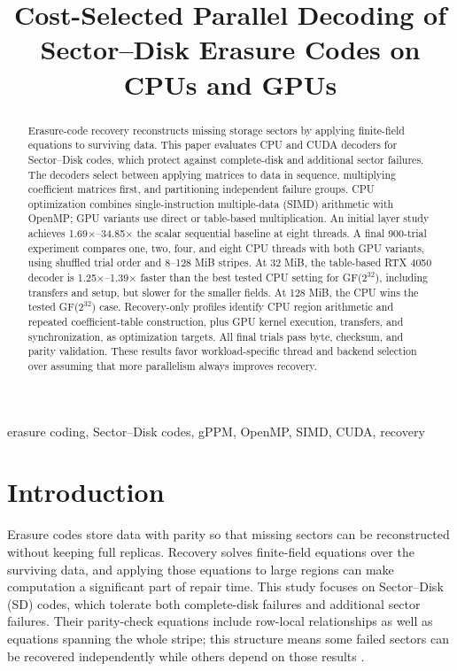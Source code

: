 \documentclass[conference]{IEEEtran}
\title{Cost-Selected Parallel Decoding of Sector--Disk Erasure Codes on CPUs and GPUs}
\author{\IEEEauthorblockN{Tejas Singh Sodhi, Arnav Verma, Advay Satish, and Dhanush Kumar}
\IEEEauthorblockA{Birla Institute of Technology and Science, Pilani\\
K K Birla Goa Campus, Goa, India}}
\begin{document}
\maketitle

\begin{abstract}
Erasure-code recovery reconstructs missing storage sectors by applying finite-field equations to surviving data. This paper evaluates CPU and CUDA decoders for Sector--Disk codes, which protect against complete-disk and additional sector failures. The decoders select between applying matrices to data in sequence, multiplying coefficient matrices first, and partitioning independent failure groups. CPU optimization combines single-instruction multiple-data (SIMD) arithmetic with OpenMP; GPU variants use direct or table-based multiplication. An initial layer study achieves 1.69$\times$--34.85$\times$ the scalar sequential baseline at eight threads. A final 900-trial experiment compares one, two, four, and eight CPU threads with both GPU variants, using shuffled trial order and 8--128 MiB stripes. At 32 MiB, the table-based RTX 4050 decoder is 1.25$\times$--1.39$\times$ faster than the best tested CPU setting for GF($2^{32}$), including transfers and setup, but slower for the smaller fields. At 128 MiB, the CPU wins the tested GF($2^{32}$) case. Recovery-only profiles identify CPU region arithmetic and repeated coefficient-table construction, plus GPU kernel execution, transfers, and synchronization, as optimization targets. All final trials pass byte, checksum, and parity validation. These results favor workload-specific thread and backend selection over assuming that more parallelism always improves recovery.
\end{abstract}

\begin{IEEEkeywords}
erasure coding, Sector--Disk codes, gPPM, OpenMP, SIMD, CUDA, recovery
\end{IEEEkeywords}

\section{Introduction}
Erasure codes store data with parity so that missing sectors can be reconstructed without keeping full replicas. Recovery solves finite-field equations over the surviving data, and applying those equations to large regions can make computation a significant part of repair time. This study focuses on Sector--Disk (SD) codes, which tolerate both complete-disk failures and additional sector failures. Their parity-check equations include row-local relationships as well as equations spanning the whole stripe; this structure means some failed sectors can be recovered independently while others depend on those results \cite{li2023gppm}.
\end{document}
